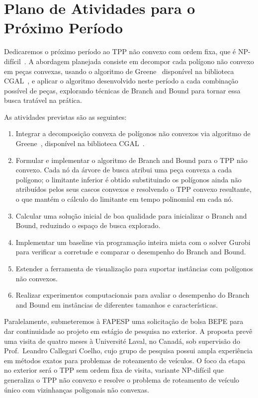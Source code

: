 \documentclass[11pt]{article}
\begin{document}
\section{Plano de Atividades para o Próximo Período}
\label{sec:proximos_passos}

Dedicaremos o próximo período ao TPP não convexo com ordem fixa, que é NP-difícil~\cite{tpp-dror-2003}. A abordagem planejada consiste em decompor cada polígono não convexo em peças convexas, usando o algoritmo de Greene~\cite{cpd-greene-1983} disponível na biblioteca CGAL~\cite{cgal}, e aplicar o algoritmo desenvolvido neste período a cada combinação possível de peças, explorando técnicas de Branch and Bound para tornar essa busca tratável na prática.

As atividades previstas são as seguintes:

\begin{enumerate}
	\item Integrar a decomposição convexa de polígonos não convexos via algoritmo de Greene~\cite{cpd-greene-1983}, disponível na biblioteca CGAL~\cite{cgal}.

	\item Formular e implementar o algoritmo de Branch and Bound para o TPP não convexo. Cada nó da árvore de busca atribui uma peça convexa a cada polígono; o limitante inferior é obtido substituindo os polígonos ainda não atribuídos pelos seus cascos convexos e resolvendo o TPP convexo resultante, o que mantém o cálculo do limitante em tempo polinomial em cada nó.

	\item Calcular uma solução inicial de boa qualidade para inicializar o Branch and Bound, reduzindo o espaço de busca explorado.

	\item Implementar um baseline via programação inteira mista com o solver Gurobi~\cite{gurobi} para verificar a corretude e comparar o desempenho do Branch and Bound.

	\item Estender a ferramenta de visualização para suportar instâncias com polígonos não convexos.

	\item Realizar experimentos computacionais para avaliar o desempenho do Branch and Bound em instâncias de diferentes tamanhos e características.
\end{enumerate}

Paralelamente, submeteremos à FAPESP uma solicitação de bolsa BEPE para dar continuidade ao projeto em estágio de pesquisa no exterior. A proposta prevê uma visita de quatro meses à Université Laval, no Canadá, sob supervisão do Prof.\ Leandro Callegari Coelho, cujo grupo de pesquisa possui ampla experiência em métodos exatos para problemas de roteamento de veículos. O foco da etapa no exterior será o TPP sem ordem fixa de visita, variante NP-difícil que generaliza o TPP não convexo e resolve o problema de roteamento de veículo único com vizinhanças poligonais não convexas.



\end{document}
